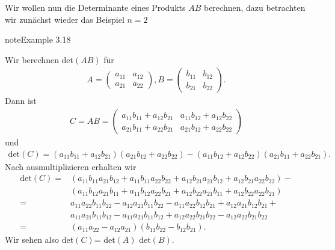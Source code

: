 \documentclass[letterpaper,10pt,english]{jupyterBook}
\begin{document}
Wir wollen nun die Determinante eines Produkts \(A B\) berechnen, dazu betrachten wir zunächst wieder das Beispiel \(n=2\)
\label{vektorraeume/LGS:example-16}
\begin{sphinxadmonition}{note}{Example 3.18}



Wir berechnen det\((AB)\) für
\begin{equation*}
\begin{split} A = \left( \begin{matrix} a_{11} & a_{12} \\ a_{21} & a_{22}  \end{matrix} \right),  B = \left( \begin{matrix} b_{11} & b_{12} \\ b_{21} & b_{22}  \end{matrix} \right).\end{split}
\end{equation*}
Dann ist
\begin{equation*}
\begin{split} C = A B = \left( \begin{matrix} a_{11} b_{11} + a_{12} b_{21}   & a_{11} b_{12} + a_{12} b_{22} \\ a_{21} b_{11} + a_{22} b_{21}    & a_{21} b_{12} + a_{22} b_{22}   \end{matrix} \right)\end{split}
\end{equation*}
und
\begin{equation*}
\begin{split} \text{det}(C) = (a_{11} b_{11} + a_{12} b_{21}) (a_{21} b_{12} + a_{22} b_{22}) - (a_{11} b_{12} + a_{12} b_{22}) (a_{21} b_{11} + a_{22} b_{21}).\end{split}
\end{equation*}
Nach ausmultiplizieren erhalten wir
\begin{align*}
  \text{det}(C) =& (a_{11} b_{11} a_{21} b_{12}  +  a_{11} b_{11} a_{22} b_{22} + a_{12} b_{21} a_{21} b_{12} +  a_{12} b_{21}a_{22} b_{22}) - \\& (a_{11} b_{12} a_{21} b_{11} + a_{11} b_{12}  a_{22} b_{21} + a_{12} b_{22} a_{21} b_{11} + a_{12} b_{22} a_{22} b_{21}) \\ =& a_{11} a_{22} b_{11}  b_{22} - a_{12} a_{21}   b_{11} b_{22}   -  a_{11} a_{22}  b_{12}  b_{21} +  a_{12}  a_{21} b_{12} b_{21}  +\\ &    a_{11} a_{21} b_{11}  b_{12} - a_{11} a_{21} b_{11}  b_{12}   +  a_{12} a_{22} b_{21} b_{22}  -  a_{12} a_{22} b_{21} b_{22}  \\=& (a_{11} a_{22} - a_{12} a_{21} )(b_{11}  b_{22}  - b_{12}  b_{21} ).
\end{align*}
Wir sehen also det\((C)\)= det\((A)\) det\((B)\).
\end{sphinxadmonition}
\end{document}
